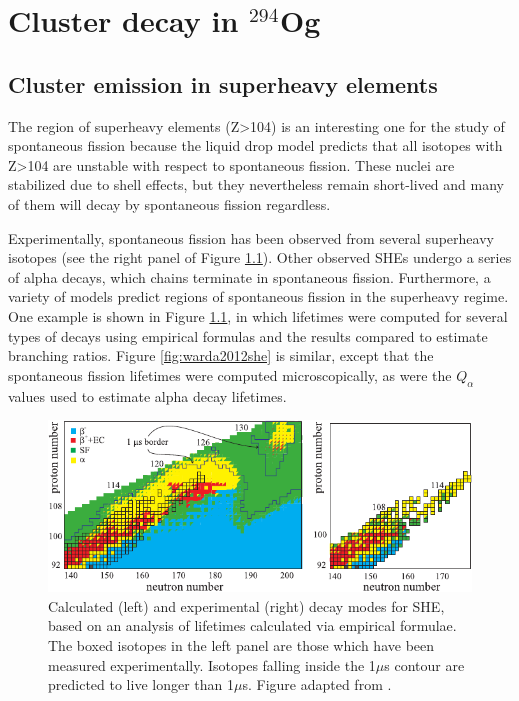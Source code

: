 \chapter{Cluster decay in $^{294}$Og}\label{chap:294Og}

\section{Cluster emission in superheavy elements}

The region of superheavy elements (Z>104) is an interesting one for the study of spontaneous fission because the liquid drop model predicts that all isotopes with Z>104 are unstable with respect to spontaneous fission. These nuclei are stabilized due to shell effects, but they nevertheless remain short-lived and many of them will decay by spontaneous fission regardless.

Experimentally, spontaneous fission has been observed from several superheavy isotopes (see the right panel of Figure \ref{fig:karpovshedecay}). Other observed SHEs undergo a series of alpha decays, which chains terminate in spontaneous fission. Furthermore, a variety of models predict regions of spontaneous fission in the superheavy regime. One example is shown in Figure \ref{fig:karpovshedecay}, in which lifetimes were computed for several types of decays using empirical formulas and the results compared to estimate branching ratios. Figure \ref{fig:warda2012she} is similar, except that the spontaneous fission lifetimes were computed microscopically, as were the $Q_\alpha$ values used to estimate alpha decay lifetimes.


\begin{figure}
	\centering
	\includegraphics[width=0.9\linewidth]{TeX_files/294Og_Karpov_SHEdecay}
	\caption[Calculated and experimental decay modes for SHE]{Calculated (left) and experimental (right) decay modes for SHE, based on an analysis of lifetimes calculated via empirical formulae. The boxed isotopes in the left panel are those which have been measured experimentally. Isotopes falling inside the 1$\mu$s contour are predicted to live longer than 1$\mu$s. Figure adapted from \cite{Karpova}.}
	\label{fig:karpovshedecay}
\end{figure}


